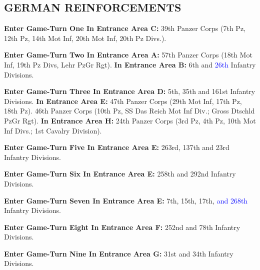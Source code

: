 \subsection{GERMAN REINFORCEMENTS}

\begin{flushleft}
  \textbf{Enter Game-Turn One In Entrance Area C:}
  \break
  39th Panzer Corps (7th Pz, 12th Pz, 14th Mot Inf,
  20th Mot Inf, 20th Pz Divs.).

  \textbf{Enter Game-Turn Two In Entrance Area A:}
  \break
  57th Panzer Corps (18th Mot Inf, 19th Pz Divs, Lehr PzGr Rgt).
  \break
  \textbf{In Entrance Area B:}
  \break
  6th and \textcolor{blue}{26th} Infantry Divisions.

  \textbf{Enter Game-Turn Three In Entrance Area D:}
  \break
  5th, 35th and 161st Infantry Divisions.
  \break
  \textbf{In Entrance Area E:}
  \break
  47th Panzer Corps (29th Mot Inf, 17th Pz, 18th Pz).
  46th Panzer Corps (10th Pz, SS Das Reich Mot Inf Div.; Gross Dtschld PzGr Rgt).
  \break
  \textbf{In Entrance Area H:}
  24th Panzer Corps (3rd Pz, 4th Pz, 10th Mot Inf Divs.; 1st Cavalry Division).

  \textbf{Enter Game-Turn Five In Entrance Area E:}
  \break
  263rd, 137th and 23rd Infantry Divisions.

  \textbf{Enter Game-Turn Six In Entrance Area E:}
  \break
  258th and 292nd Infantry Divisions.

  \textbf{Enter Game-Turn Seven In Entrance Area E:}
  \break
  7th, 15th, 17th, \textcolor{blue}{and 268th} Infantry Divisions.

  \textbf{Enter Game-Turn Eight In Entrance Area F:}
  \break
  252nd and 78th Infantry Divisions.

  \textbf{Enter Game-Turn Nine In Entrance Area G:}
  \break
  31st and 34th Infantry Divisions.
\end{flushleft}
